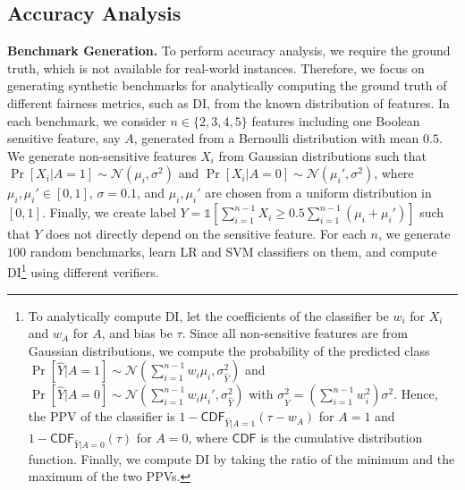 \subsection{Accuracy Analysis}
\noindent\textbf{Benchmark Generation.} To perform accuracy analysis, we require the ground truth, which is not available for real-world instances. Therefore, we focus on generating synthetic benchmarks for analytically computing the ground truth of different fairness metrics, such as DI, from the known distribution of features. In each benchmark, we consider $ n \in \{2, 3, 4, 5\} $ features including one Boolean sensitive feature, say $ A $, generated from a Bernoulli distribution with mean $ 0.5 $.  We generate non-sensitive features $ X_i $ from Gaussian distributions such that   $ \Pr[X_i | A = 1] \sim \mathcal{N}(\mu_i, \sigma^2) $ and $ \Pr[X_i | A = 0] \sim \mathcal{N}(\mu_i', \sigma^2) $, where $ \mu_i, \mu_i' \in [0,1] $, $ \sigma = 0.1 $, and $ \mu_i, \mu_i' $ are chosen from a uniform distribution in $ [0,1] $. Finally, we create label $ Y = \mathds{1}[ \sum_{i=1}^{n-1} X_i \ge 0.5 \sum_{i=1}^{n-1} (\mu_i + \mu_i')] $ such that $ Y $ does not directly depend on the sensitive feature. For each $ n $, we generate $ 100 $ random benchmarks, learn LR and SVM classifiers on them, and compute DI\footnote{  
To analytically compute DI, let the coefficients of the classifier be $ w_i $ for $ X_i $ and $ w_A $ for $ A $, and bias be $ \tau $. Since all non-sensitive features are from Gaussian distributions, we compute the probability of the predicted class $ \Pr[\hat{Y} | A = 1]  \sim \mathcal{N}(\sum_{i=1}^{n-1}w_i\mu_i, \sigma_{\hat{Y}}^2) $ and $ \Pr[\hat{Y} | A = 0]  \sim \mathcal{N}(\sum_{i=1}^{n-1}w_i\mu_i', \sigma_{\hat{Y}}^2) $ with $ \sigma_{\hat{Y}}^2 =   (\sum_{i=1}^{n-1}w_i^2)\sigma^2 $. Hence, the PPV of the classifier  is $  1 - \mathsf{CDF}_{\hat{Y}| A =1}(\tau - w_A) $ for $ A = 1 $ and $  1 - \mathsf{CDF}_{\hat{Y}|A=0}(\tau) $ for $ A = 0 $, where $ \mathsf{CDF} $ is the cumulative distribution function. Finally, we compute DI by taking the ratio of the minimum and the maximum of the two PPVs.}
using different verifiers.



